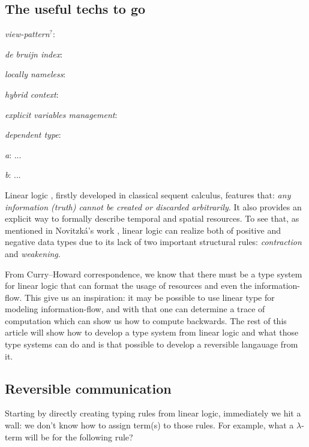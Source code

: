 \documentclass[a4paper,twocolumn]{article}
\begin{document}
\subsection*{The useful techs to go}

\begin{inlinelist}
\item \textit{view-pattern$^{?}$}:
\item \textit{de bruijn index}:
\item \textit{locally nameless}:
\item \textit{hybrid context}:
\item \textit{explicit variables management}:
\item \textit{dependent type}:
    \begin{sublist}
    \item \textit{a}: ...
    \item \textit{b}: ...
    \end{sublist}
\end{inlinelist}

\newpage

Linear logic \cite{Girard95}, firstly developed in classical sequent calculus, features that: \textit{any information (truth) cannot be created or discarded arbitrarily}. It also provides an explicit way to formally describe temporal and spatial resources. To see that, as mentioned in Novitzk\'{a}'s work \cite{Novitzka07}, linear logic can realize both of positive and negative data types due to its lack of two important structural rules: \textit{contraction} and \textit{weakening}.

From Curry–Howard correspondence, we know that there must be a type system for linear logic that can format the usage of resources and even the information-flow. This give us an inspiration: it may be possible to use linear type for modeling information-flow, and with that one can determine a trace of computation which can show us how to compute backwards. The rest of this article will show how to develop a type system from linear logic and what those type systems can do and is that possible to develop a reversible langauage from it.

\subsection*{Reversible communication}

Starting by directly creating typing rules from linear logic, immediately we hit a wall: we don't know how to assign term(s) to those rules. For example, what a $\lambda$-term will be for the following rule?
\end{document}
